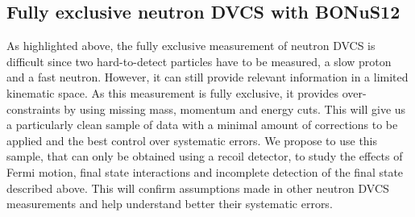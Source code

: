 \subsection{Fully exclusive neutron DVCS with BONuS12}

As highlighted above, the fully exclusive measurement of neutron DVCS is 
difficult since two hard-to-detect particles have to be measured, a slow proton 
and a fast neutron.  However, it can still provide relevant information in a 
limited kinematic space. As this measurement is fully exclusive, it provides 
over-constraints by using missing mass, momentum and energy cuts. This will 
give us a particularly clean sample of data with a minimal amount of 
corrections to be applied and the best control over systematic errors. We 
propose to use this sample, that can only be obtained using a recoil detector, 
to study the effects of Fermi motion, final state interactions and incomplete 
detection of the final state described above. This will confirm assumptions 
made in other neutron DVCS measurements and help understand better their 
systematic errors.



